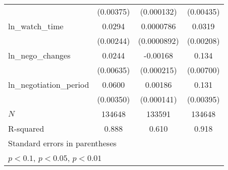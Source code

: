 {\begin{tabular}{l*{3}{c}}
            &   (0.00375)         &  (0.000132)         &   (0.00435)         \\
\addlinespace
ln\_watch\_time&      0.0294\sym{***}&   0.0000786         &      0.0319\sym{***}\\
            &   (0.00244)         & (0.0000892)         &   (0.00208)         \\
\addlinespace
ln\_nego\_changes&      0.0244\sym{***}&    -0.00168\sym{***}&       0.134\sym{***}\\
            &   (0.00635)         &  (0.000215)         &   (0.00700)         \\
\addlinespace
ln\_negotiation\_period&      0.0600\sym{***}&     0.00186\sym{***}&       0.131\sym{***}\\
            &   (0.00350)         &  (0.000141)         &   (0.00395)         \\
\midrule
\(N\)       &      134648         &      133591         &      134648         \\
R-squared   &       0.888         &       0.610         &       0.918         \\
\bottomrule
\multicolumn{4}{l}{\footnotesize Standard errors in parentheses}\\
\multicolumn{4}{l}{\footnotesize \sym{*} \(p<0.1\), \sym{**} \(p<0.05\), \sym{***} \(p<0.01\)}\\
\end{tabular}
}
